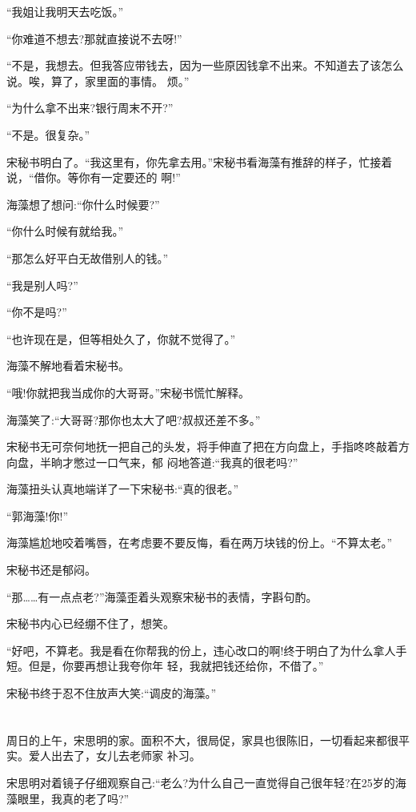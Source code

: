 \documentclass[11pt,a4paper,onecolumn]{article}
\begin{document}
``我姐让我明天去吃饭。''

``你难道不想去?那就直接说不去呀!''

``不是，我想去。但我答应带钱去，因为一些原因钱拿不出来。不知道去了该怎么说。唉，算了，家里面的事情。
烦。''

``为什么拿不出来?银行周末不开?''

``不是。很复杂。''

宋秘书明白了。``我这里有，你先拿去用。''宋秘书看海藻有推辞的样子，忙接着说，``借你。等你有一定要还的
啊!''

海藻想了想问:``你什么时候要?''

``你什么时候有就给我。''

``那怎么好平白无故借别人的钱。''

``我是别人吗?''

``你不是吗?''

``也许现在是，但等相处久了，你就不觉得了。''

海藻不解地看着宋秘书。

``哦!你就把我当成你的大哥哥。''宋秘书慌忙解释。

海藻笑了:``大哥哥?那你也太大了吧?叔叔还差不多。''

宋秘书无可奈何地抚一把自己的头发，将手伸直了把在方向盘上，手指咚咚敲着方向盘，半晌才憋过一口气来，郁
闷地答道:``我真的很老吗?''

海藻扭头认真地端详了一下宋秘书:``真的很老。''

``郭海藻!你!''

海藻尴尬地咬着嘴唇，在考虑要不要反悔，看在两万块钱的份上。``不算太老。''

宋秘书还是郁闷。

``那……有一点点老?''海藻歪着头观察宋秘书的表情，字斟句酌。

宋秘书内心已经绷不住了，想笑。

``好吧，不算老。我是看在你帮我的份上，违心改口的啊!终于明白了为什么拿人手短。但是，你要再想让我夸你年
轻，我就把钱还给你，不借了。''

宋秘书终于忍不住放声大笑:``调皮的海藻。''

\section[\thesection]{}

周日的上午，宋思明的家。面积不大，很局促，家具也很陈旧，一切看起来都很平实。爱人出去了，女儿去老师家
补习。

宋思明对着镜子仔细观察自己:``老么?为什么自己一直觉得自己很年轻?在25岁的海藻眼里，我真的老了吗?''
\end{document}
